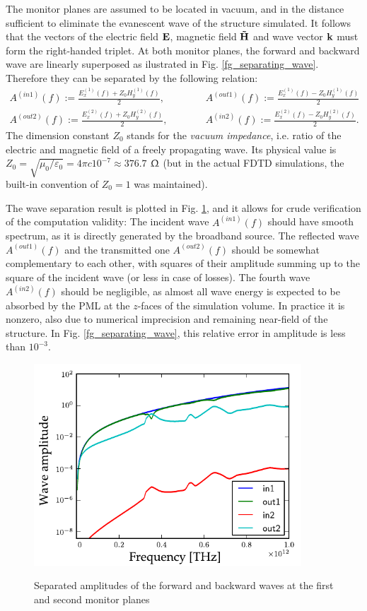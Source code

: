 The monitor planes are assumed to be located in vacuum, and in the distance sufficient to eliminate the evanescent wave of the structure simulated. It follows that the vectors of the electric field $\mathbf{E}$, magnetic field $\mathbf{\tilde{H}}$ and wave vector ${\mathbf{k}}$ must form the right-handed triplet. %
At both monitor planes, the forward and backward wave are linearly superposed as ilustrated in Fig. \ref{fg_separating_wave}. Therefore they can be separated by the following relation: 
\begin{equation} 
\begin{split}
A^{(in 1)}(f)  := \frac{E_{x}^{(1)}(f) + Z_0 H_{y}^{(1)}(f)}{2}, \quad \quad \quad & A^{(out 1)}(f) := \frac{E_{x}^{(1)}(f) - Z_0 H_{y}^{(1)}(f)}{2}\\
A^{(out 2)}(f) := \frac{E_{x}^{(2)}(f) + Z_0 H_{y}^{(2)}(f)}{2}, \quad \quad \quad & A^{(in 2)}(f)  := \frac{E_{x}^{(2)}(f) - Z_0 H_{y}^{(2)}(f)}{2}. 
\end{split}
\label{eq_}\end{equation}
The dimension constant $Z_0$ stands for the \textit{vacuum impedance}, i.e. ratio of the electric and magnetic field of a freely propagating wave. Its physical value is $Z_0 = \sqrt{\mu_0/\varepsilon_0} = 4\pi c 10^{-7} \approx 376.7$ $\Upomega$ (but in the actual FDTD simulations, the built-in convention of $Z_0 = 1$ was maintained).

The wave separation result is plotted in Fig. \ref{fg_ampli}, and it allows for crude verification of the computation validity: The incident wave $A^{(in 1)}(f)$ should have smooth spectrum, as it is directly generated by the broadband source. The reflected wave $A^{(out 1)}(f)$ and the transmitted one $A^{(out 2)}(f)$ should be somewhat complementary to each other, with squares of their amplitude summing up to the square of the incident wave (or less in case of losses). The fourth wave $A^{(in 2)}(f)$ should be negligible, as almost all wave energy is expected to be absorbed by the PML at the $z$-faces of the simulation volume. In practice it is nonzero, also due to numerical imprecision and remaining near-field of the structure. In Fig. \ref{fg_separating_wave}, this relative error in amplitude is less than $10^{-3}$.
\begin{figure}[h] \caption{Separated amplitudes of the forward and backward waves at the first and second monitor planes}  \centering \includegraphics[width=10cm]{img/sim_ampli_debug_band.pdf}\label{fg_ampli} \end{figure} 

